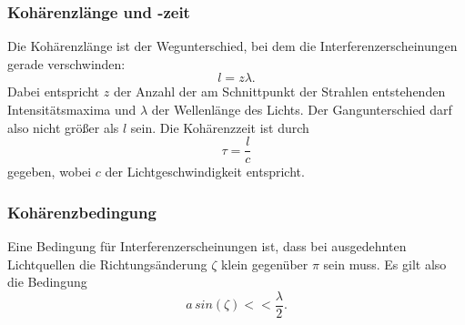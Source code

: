 \subsubsection{Kohärenzlänge und -zeit}
Die Kohärenzlänge ist der Wegunterschied, bei dem die Interferenzerscheinungen
gerade verschwinden:
\begin{equation*}
    l = z \lambda.
\end{equation*}
Dabei entspricht $z$ der Anzahl der am Schnittpunkt der Strahlen entstehenden Intensitätsmaxima 
und $\lambda$ der Wellenlänge des Lichts. 
Der Gangunterschied darf also nicht größer als $l$ sein.
\newline
Die Kohärenzzeit ist durch
\begin{equation*}
    \tau = \frac{l}{c}
\end{equation*}
gegeben, wobei $c$ der Lichtgeschwindigkeit entspricht.


\subsubsection{Kohärenzbedingung}
Eine Bedingung für Interferenzerscheinungen ist, dass bei ausgedehnten 
Lichtquellen die Richtungsänderung $\zeta$ 
klein gegenüber $\pi$ sein muss. Es gilt also die Bedingung 
\begin{equation*}
    a \, sin(\zeta) << \frac{\lambda}{2}.
\end{equation*}


